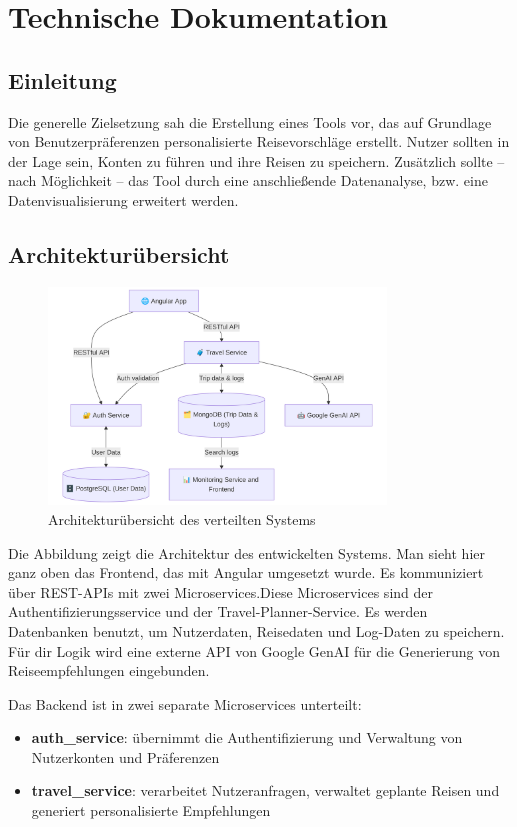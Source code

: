 \section{Technische Dokumentation}

\subsection{Einleitung}

Die generelle Zielsetzung sah die Erstellung eines Tools vor, das auf Grundlage von Benutzerpräferenzen personalisierte Reisevorschläge erstellt. Nutzer sollten in der Lage sein, Konten zu führen und ihre Reisen zu speichern.
Zusätzlich sollte – nach Möglichkeit – das Tool durch eine anschließende Datenanalyse, bzw. eine Datenvisualisierung erweitert werden.  

\subsection{Architekturübersicht}

\begin{figure}[h]
  \centering
  \includegraphics[width=0.8\textwidth]{images/architecture.png}
  \caption{Architekturübersicht des verteilten Systems}
\end{figure}

Die Abbildung zeigt die Architektur des entwickelten Systems. Man sieht hier ganz oben das Frontend, das mit Angular umgesetzt wurde. Es kommuniziert über REST-APIs mit zwei Microservices.Diese Microservices sind der Authentifizierungsservice und der Travel-Planner-Service. Es werden Datenbanken benutzt, um Nutzerdaten, Reisedaten und Log-Daten zu speichern. Für dir Logik wird eine externe API von Google GenAI für die Generierung von Reiseempfehlungen eingebunden.

Das Backend ist in zwei separate Microservices unterteilt:
\begin{itemize}
  \item \textbf{auth\_service}: übernimmt die Authentifizierung und Verwaltung von Nutzerkonten und Präferenzen
  \item \textbf{travel\_service}: verarbeitet Nutzeranfragen, verwaltet geplante Reisen und generiert personalisierte Empfehlungen
\end{itemize}

